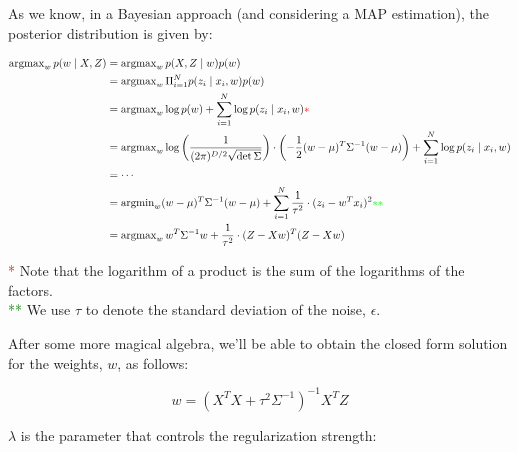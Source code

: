 \documentclass[12pt]{article}
\begin{document}
\begin{enumerate}[leftmargin=\labelsep]
        As we know, in a Bayesian approach (and considering a MAP estimation), the posterior
        distribution is given by:

        \begin{align*}
          \operatorname{argmax}_w p(w \mid X, Z) & = \operatorname{argmax}_w p(X, Z \mid w) p(w)                                                 \\
                                                 & = \operatorname{argmax}_w \Pi_{i=1}^N p(z_i \mid x_i, w) p(w)                                 \\
                                                 & = \operatorname{argmax}_w \log p(w) + \sum_{i=1}^N \log p(z_i \mid x_i, w) \textcolor{red}{*} \\
                                                 & = \operatorname{argmax}_w \log{\left(\frac{1}{(2 \pi)^{D/2} \sqrt{\det{\Sigma}}}\right)}
          \cdot \left(- \frac{1}{2} (w - \mu)^T \Sigma^{-1} (w - \mu)\right)
          + \sum_{i=1}^N \log p(z_i \mid x_i, w)                                                                                                 \\
                                                 & = \cdots                                                                                      \\
                                                 & = \operatorname{argmin}_w (w - \mu)^T \Sigma^{-1} (w - \mu)
          + \sum_{i=1}^N \frac{1}{\tau^2} \cdot (z_i - w^T x_i)^2 \textcolor{green}{**}                                                          \\
                                                 & = \operatorname{argmax}_w w^T \Sigma^{-1} w + \frac{1}{\tau^2} \cdot (Z - X w)^T (Z - X w)
        \end{align*}

        \textcolor{red}{*} Note that the logarithm of a product is the sum of the logarithms of the factors. \\
        \textcolor{green}{**} We use $\tau$ to denote the standard deviation of the noise, $\epsilon$.

        After some more magical algebra, we'll be able to obtain the closed form solution
        for the weights, $w$, as follows:

        $$
          w = (X^T X + \tau^2 \Sigma^{-1})^{-1} X^T Z
        $$

        $\lambda$ is the parameter that controls the regularization strength:


\end{enumerate}
\end{document}
